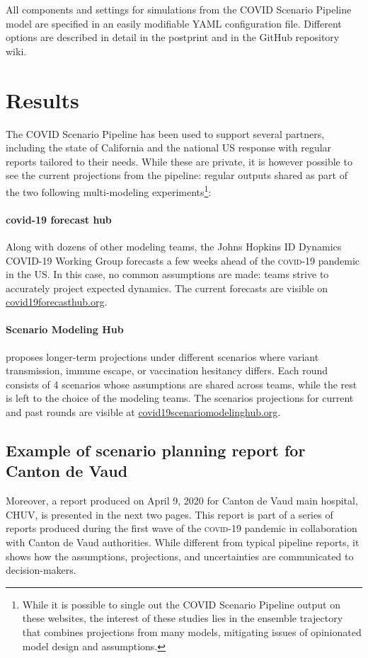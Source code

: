 All components and settings for simulations from the COVID  Scenario Pipeline model are specified in an easily modifiable YAML configuration file. Different options are described in detail in the postprint and in the GitHub repository wiki.

\section{Results}
The COVID Scenario Pipeline has been used to support several partners, including the state of California and the national US response with regular reports tailored to their needs. While these are private, it is however possible to see the current projections from the pipeline: regular outputs shared as part of the two following multi-modeling experiments\footnote{While it is possible to single out the COVID Scenario Pipeline output on these websites, the interest of these studies lies in the ensemble trajectory that combines projections from many models, mitigating issues of opinionated model design and assumptions.}:

\paragraph{covid-19 forecast hub} Along with dozens of other modeling teams, the Johns Hopkins ID Dynamics COVID-19 Working Group forecasts a few weeks ahead of the \textsc{covid}-19 pandemic in the US. In this case, no common assumptions are made: teams strive to accurately project expected dynamics. The current forecasts are visible on \url{covid19forecasthub.org}\cite{Cramer:EvaluationIndividualEnsemble:2021}.

\paragraph{Scenario Modeling Hub} proposes longer-term projections under different scenarios where \eg variant transmission, immune escape, or vaccination hesitancy differs. Each round consists of 4 scenarios whose assumptions are shared across teams, while the rest is left to the choice of the modeling teams. The scenarios projections for current and past rounds are visible at \url{covid19scenariomodelinghub.org}\cite[][presents round 4 results.]{Borchering:ModelingFutureCOVID19:2021}.

\subsection{Example of scenario planning report for Canton de Vaud}
Moreover, a report produced on April 9, 2020 for Canton de Vaud main hospital, CHUV, is presented in the next two pages. This report is part of a series of reports produced during the first wave of the \textsc{covid}-19 pandemic in collaboration with Canton de Vaud authorities. While different from typical pipeline reports, it shows how the assumptions, projections, and uncertainties are communicated to decision-makers. 

